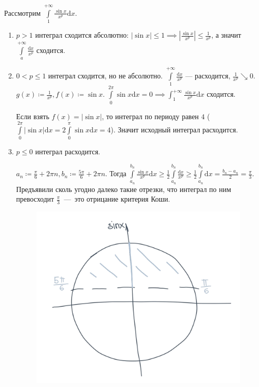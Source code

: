 \begin{example}
    Рассмотрим $\int\limits_1^{+\infty} \frac{\sin x}{x^p} \mathrm{d}x$.
    \begin{enumerate}
    \item $p > 1$ интеграл сходится абсолютно:  $|\sin x| \le 1 \implies \left| \frac{\sin x}{x^p} \right| \le \frac{1}{x^p}$, а значит $\int\limits_a^{+\infty} \frac{\mathrm{d}x}{x^p}$ сходится.
    \item $0 < p \le 1$ интеграл сходится, но не абсолютно. $\int\limits_1^{+\infty} \frac{\mathrm{d}x}{x^p}$ --- расходится, $\frac{1}{x^p} \searrow 0$.\\
    $g(x) \coloneqq \frac{1}{x^p}, f(x) \coloneqq \sin x$. $\int\limits_0^{2\pi} \sin x \mathrm{d}x = 0 \implies \int_1^{+\infty} \frac{\sin x}{x^p} \mathrm{d}x$ сходится.

        Если взять $f(x) = |\sin x|$, то интеграл по периоду равен  $4$ ($\int\limits_0^{2\pi} |\sin x| \mathrm{d}x = 2\int\limits_0^{\pi} \sin x \mathrm{d}x = 4$). Значит исходный интеграл расходится.
        \newpage
    \item $p \le 0$ интеграл расходится. 

        $a_n \coloneqq \frac{\pi}{6} + 2\pi n, b_n \coloneqq \frac{5\pi}{6} + 2\pi n$. Тогда $\int\limits_{a_n}^{b_n} \frac{\sin x}{x^p} \mathrm{d}x \ge \frac{1}{2} \int\limits_{a_n}^{b_n} \frac{\mathrm{d}x}{x^p} \ge \frac{1}{2} \int\limits_{a_n}^{b_n}\mathrm{d}x = \frac{b_n - a_n}{2} = \frac{\pi}{3}$.\\
        Предъявили сколь угодно далеко такие отрезки, что интеграл по ним превосходит $\frac{\pi}{3}$~---~это отрицание критерия Коши.
        \begin{figure}[h!]
        	\includegraphics[scale=0.15]{sin_trigonometry}
        \end{figure}
    \end{enumerate}
\end{example}
